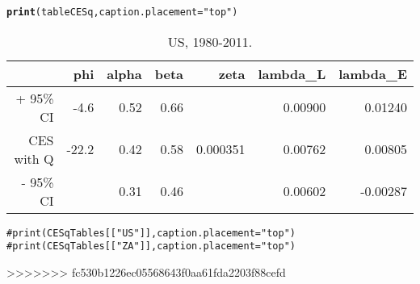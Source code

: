 \documentclass[preprint,authoryear,12pt]{elsarticle}\usepackage{graphicx, color}
\makeatletter
\newcommand{\hlfunctioncall}[1]{\textcolor[rgb]{0.501960784313725,0,0.329411764705882}{\textbf{#1}}}%
\newcommand{\hlstring}[1]{\textcolor[rgb]{0.6,0.6,1}{#1}}%
\newcommand{\hlcomment}[1]{\textcolor[rgb]{0.180392156862745,0.6,0.341176470588235}{#1}}%
\newenvironment{kframe}{%
 \def\at@end@of@kframe{}%
 \ifinner\ifhmode%
  \def\at@end@of@kframe{\end{minipage}}%
  \begin{minipage}{\columnwidth}%
 \fi\fi%
 \def\FrameCommand##1{\hskip\@totalleftmargin \hskip-\fboxsep
 \colorbox{shadecolor}{##1}\hskip-\fboxsep
     \hskip-\linewidth \hskip-\@totalleftmargin \hskip\columnwidth}%
 \MakeFramed {\advance\hsize-\width
   \@totalleftmargin\z@ \linewidth\hsize
   \@setminipage}}%
 {\par\unskip\endMakeFramed%
 \at@end@of@kframe}
\makeatother
\begin{document}
\begin{kframe}
\begin{alltt}
\hlfunctioncall{print}(tableCESq, caption.placement=\hlstring{"top"})
\end{alltt}
\end{kframe}%
\begin{table}[ht]
\begin{center}
\caption{US, 1980-2011.}
\begin{tabular}{rrrrrrr}
  \hline
 & phi & alpha & beta & zeta & lambda\_L & lambda\_E \\ 
  \hline
+ 95\% CI & -4.6 & 0.52 & 0.66 &  & 0.00900 & 0.01240 \\ 
  CES with Q & -22.2 & 0.42 & 0.58 & 0.000351 & 0.00762 & 0.00805 \\ 
  - 95\% CI &  & 0.31 & 0.46 &  & 0.00602 & -0.00287 \\ 
   \hline
\end{tabular}
\end{center}
\end{table}
\begin{kframe}\begin{alltt}

\hlcomment{#print(CESqTables[["US"]], caption.placement="top")}
\hlcomment{#print(CESqTables[["ZA"]], caption.placement="top")}
\end{alltt}
\end{kframe}
>>>>>>> fc530b1226ec05568643f0aa61fda2203f88cefd



\end{document}

